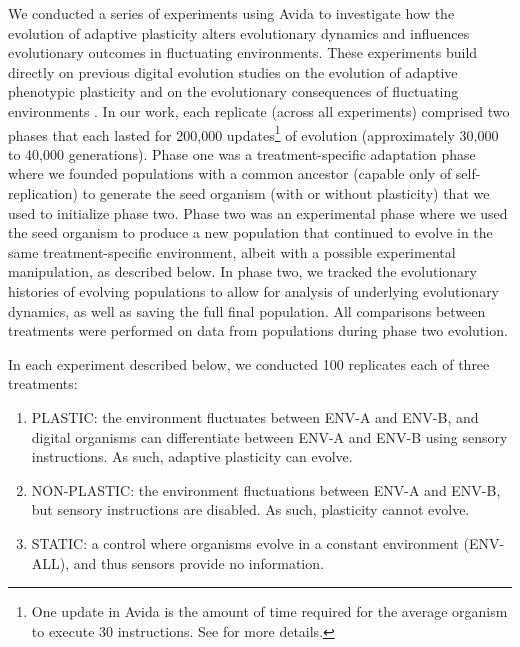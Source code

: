 We conducted a series of experiments using Avida to investigate how the evolution of adaptive plasticity alters evolutionary dynamics and influences evolutionary outcomes in fluctuating environments.
These experiments build directly on previous digital evolution studies on the evolution of adaptive phenotypic plasticity \citep{clune_investigating_2007,lalejini_evolutionary_2016} and on the evolutionary consequences of fluctuating environments \citep{wilke_evolution_2001,canino-koning_fluctuating_2019}.
In our work, each replicate (across all experiments) comprised two phases that each lasted for 200,000 updates\footnote{
    One update in Avida is the amount of time required for the average organism to execute 30 instructions. 
    See \citep{ofria_avida:_2009} for more details.
} 
of evolution (approximately 30,000 to 40,000 generations).  
Phase one was a treatment-specific adaptation phase where we founded populations with a common ancestor (capable only of self-replication) to generate the seed organism (with or without plasticity) that we used to initialize phase two.
Phase two was an experimental phase where we used the seed organism to produce a new population that continued to evolve in the same treatment-specific environment, albeit with a possible experimental manipulation, as described below.
In phase two, we tracked the evolutionary histories of evolving populations to allow for analysis of underlying evolutionary dynamics, as well as saving the full final population.
All comparisons between treatments were performed on data from populations during phase two evolution.

% 

In each experiment described below, we conducted 100 replicates each of three treatments:
\begin{enumerate}
    \item PLASTIC: the environment fluctuates between ENV-A and ENV-B, and digital organisms can differentiate between ENV-A and ENV-B using sensory instructions. As such, adaptive plasticity can evolve.
    \item NON-PLASTIC: the environment fluctuations between ENV-A and ENV-B, but sensory instructions are disabled. As such, plasticity cannot evolve.
    \item STATIC: a control where organisms evolve in a constant environment (ENV-ALL), and thus sensors provide no information.
\end{enumerate}

